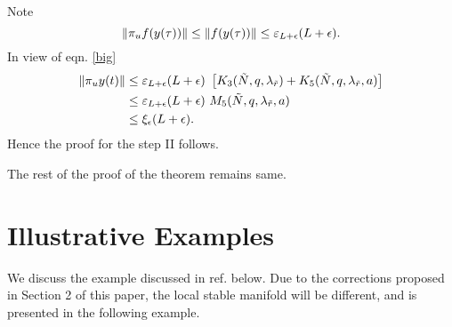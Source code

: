  Note
 \begin{equation}
 \lVert \pi_u f(y(\tau))\rVert \leq \lVert f(y(\tau))\rVert \leq \varepsilon_{L+\epsilon}(L+\epsilon).
 \end{equation}
 In view of eqn. \eqref{big} 
 \begin{align}
\nonumber\lVert \pi_u y(t)\rVert &\leq \varepsilon_{L+\epsilon}(L+\epsilon)~\left[ K_3(\tilde{N},q,\lambda_{\tilde{r}}) + K_5(\tilde{N},q,\lambda_{\tilde{r}},a)\right] \\
\nonumber&\leq \varepsilon_{L+\epsilon}(L+\epsilon) ~M_5 (\tilde{N},q,\lambda_{\tilde{r}},a)\\
&\leq \xi_{\epsilon} (L + \epsilon).
 \end{align}
 Hence the proof for the step II follows.
 
 The rest of the proof of the theorem remains same.
 \section{Illustrative Examples}
 \label{exmp}
 We discuss the example discussed in ref. \cite{deshpande2016local} below. Due to the corrections proposed in Section 2 of this paper, the local stable manifold will be different, and is presented in the following example.  
